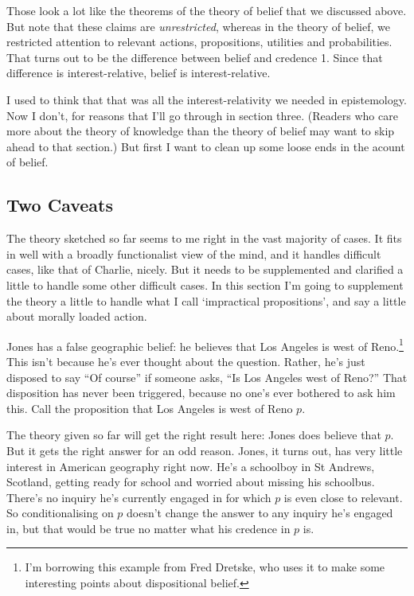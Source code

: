 \noindent Those look a lot like the theorems of the theory of belief that we discussed above. But note that these claims are \textit{unrestricted}, whereas in the theory of belief, we restricted attention to relevant actions, propositions, utilities and probabilities. That turns out to be the difference between belief and credence 1. Since that difference is interest-relative, belief is interest-relative.

I used to think that that was all the interest-relativity we needed in epistemology. Now I don't, for reasons that I'll go through in section three. (Readers who care more about the theory of knowledge than the theory of belief may want to skip ahead to that section.) But first I want to clean up some loose ends in the acount of belief.

\subsection{Two Caveats}
The theory sketched so far seems to me right in the vast majority of cases. It fits in well with a broadly functionalist view of the mind, and it handles difficult cases, like that of Charlie, nicely. But it needs to be supplemented and clarified a little to handle some other difficult cases. In this section I'm going to supplement the theory a little to handle what I call `impractical propositions', and say a little about morally loaded action.

Jones has a false geographic belief: he believes that Los Angeles is west of Reno.\footnote{I'm borrowing this example from Fred Dretske, who uses it to make some interesting points about dispositional belief.} This isn't because he's ever thought about the question. Rather, he's just disposed to say ``Of course'' if someone asks, ``Is Los Angeles west of Reno?'' That disposition has never been triggered, because no one's ever bothered to ask him this. Call the proposition that Los Angeles is west of Reno $p$. 

The theory given so far will get the right result here: Jones does believe that $p$. But it gets the right answer for an odd reason. Jones, it turns out, has very little interest in American geography right now. He's a schoolboy in St Andrews, Scotland, getting ready for school and worried about missing his schoolbus. There's no inquiry he's currently engaged in for which $p$ is even close to relevant. So conditionalising on $p$ doesn't change the answer to any inquiry he's engaged in, but that would be true no matter what his credence in $p$ is.


